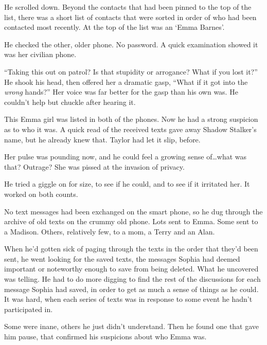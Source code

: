 He scrolled down.  Beyond the contacts that had been pinned to the top of the list, there was a short list of contacts that were sorted in order of who had been contacted most recently.  At the top of the list was an `Emma Barnes'.



He checked the other, older phone.  No password.  A quick examination showed it was her civilian phone.



``Taking this out on patrol?  Is that stupidity or arrogance?  What if you lost it?''  He shook his head, then offered her a dramatic gasp, ``What if it got into the \emph{wrong} hands?''  Her voice was far better for the gasp than his own was.  He couldn't help but chuckle after hearing it.



This Emma girl was listed in both of the phones.  Now he had a strong suspicion as to who it was.  A quick read of the received texts gave away Shadow Stalker's name, but he already knew that.  Taylor had let it slip, before.



Her pulse was pounding now, and he could feel a growing sense of\ldots what was that?  Outrage?  She was pissed at the invasion of privacy.



He tried a giggle on for size, to see if he could, and to see if it irritated her.  It worked on both counts.



No text messages had been exchanged on the smart phone, so he dug through the archive of old texts on the crummy old phone.  Lots sent to Emma.  Some sent to a Madison.  Others, relatively few, to a mom, a Terry and an Alan.



When he'd gotten sick of paging through the texts in the order that they'd been sent, he went looking for the saved texts, the messages Sophia had deemed important or noteworthy enough to save from being deleted.  What he uncovered was telling.  He had to do more digging to find the rest of the discussions for each message Sophia had saved, in order to get as much a sense of things as he could.  It was hard, when each series of texts was in response to some event he hadn't participated in.



Some were inane, others he just didn't understand.  Then he found one that gave him pause, that confirmed his suspicions about who Emma was.



